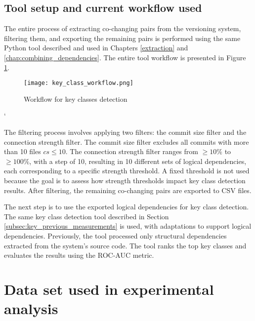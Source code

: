\subsection{Tool setup and current workflow used}
\label{subsec:key_tool}

\hspace{4em}The entire process of extracting co-changing pairs from the versioning system, filtering them, and exporting the remaining pairs is performed using the same Python tool described and used in Chapters \ref{extraction} and \ref{chap:combining_dependencies}. The entire tool workflow is presented in Figure \ref{fig:workflow_key}.

\begin{figure}[H]
\centering
\texttt{[image: key\_class\_workflow.png]}
\caption{Workflow for key classes detection}
\label{fig:workflow_key}
\centering
\end{figure}`


The filtering process involves applying two filters: the commit size filter and the connection strength filter. The commit size filter excludes all commits with more than 10 files \(cs \leq 10\). The connection strength filter ranges from \( \geq 10\% \) to \( \geq 100\% \), with a step of 10, resulting in 10 different sets of logical dependencies, each corresponding to a specific strength threshold. A fixed threshold is not used because the goal is to assess how strength thresholds impact key class detection results. After filtering, the remaining co-changing pairs are exported to CSV files.

The next step is to use the exported logical dependencies for key class detection. The same key class detection tool described in Section \ref{subsec:key_previous_measurements} is used, with adaptations to support logical dependencies. Previously, the tool processed only structural dependencies extracted from the system's source code. The tool ranks the top key classes and evaluates the results using the ROC-AUC metric.





\section{Data set used in experimental analysis}
\label{sec:key_dataset}


